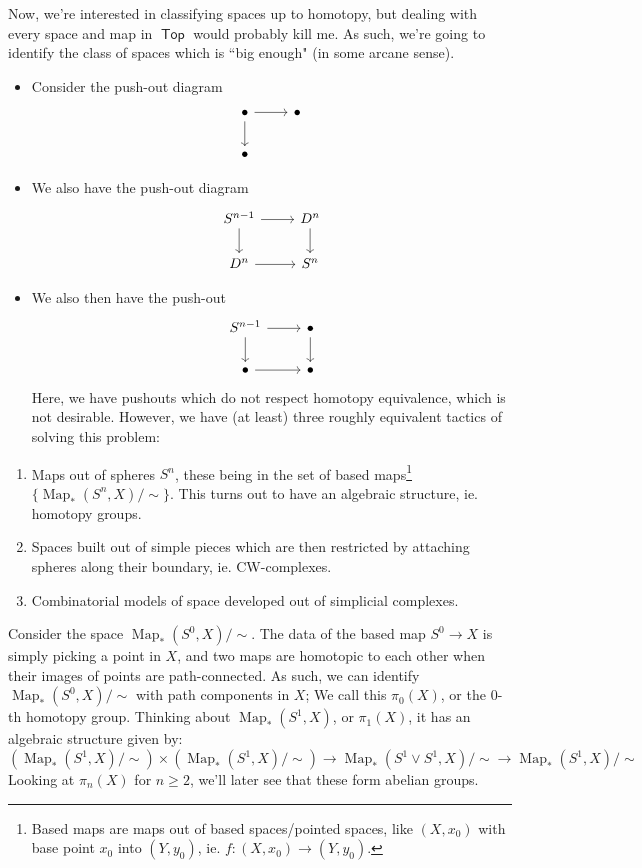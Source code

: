 \documentclass[leqno, openany]{memoir}
\theoremstyle{definition}
\theoremstyle{remark}
\theoremstyle{plain}
\theoremstyle{definition}
\theoremstyle{remark}
\DeclareMathOperator{\Top}{\mathsf{Top}}
\DeclareMathOperator{\Map}{Map}
\begin{document}
Now, we're interested in classifying spaces up to homotopy, but dealing with every space and map in $\Top$ would probably kill me. As such, we're going to identify the class of spaces which is ``big enough" (in some arcane sense).

\begin{itemize}
    \item Consider the push-out diagram 
\[\begin{tikzcd}
    \bullet \ar[d] \ar[r] & \bullet \\ \bullet
\end{tikzcd}\]
\item We also have the push-out diagram 
\[\begin{tikzcd}
    S^{n-1} \ar[r] \ar[d] & D^n \ar[d]\\ D^n \ar[r] & S^n
\end{tikzcd}\]
\item We also then have the push-out
\[\begin{tikzcd}
    S^{n-1} \ar[r] \ar[d] &\bullet \ar[d] \\ \bullet \ar[r] & \bullet
\end{tikzcd}\]
Here, we have pushouts which do not respect homotopy equivalence, which is not desirable. However, we have (at least) three roughly equivalent tactics of solving this problem:
\end{itemize}
\newpage 

\begin{enumerate}
    \item Maps out of spheres $S^n$, these being in the set of based maps\footnote{Based maps are maps out of based spaces/pointed spaces, like $(X,x_0)$ with base point $x_0$ into $(Y, y_0)$, ie. $f: (X,x_0) \to (Y,y_0)$.} $\{\Map_\ast (S^n, X)/\sim \}$. This turns out to have an algebraic structure, ie. homotopy groups.
    \item Spaces built out of simple pieces which are then restricted by attaching spheres along their boundary, ie. CW-complexes.
    \item Combinatorial models of space developed out of simplicial complexes.
\end{enumerate}

Consider the space $\Map_\ast(S^0, X)/\sim $. The data of the based map $S^0 \to X$ is simply picking a point in $X$, and two maps are homotopic to each other when their images of points are path-connected. As such, we can identify $\Map_\ast(S^0, X)/\sim$ with path components in $X$; We call this $\pi_0(X)$, or the $0$-th homotopy group. Thinking about $\Map_\ast(S^1, X)$, or $\pi_1(X)$, it has an algebraic structure given by:
\[\left(\Map_\ast(S^1,X)/\sim\right) \times \left( \Map_\ast(S^1, X)/\sim \right) \rightarrow \Map_\ast(S^1 \vee S^1, X)/\sim \rightarrow \Map_\ast(S^1, X)/\sim\]
Looking at $\pi_n(X)$ for $n \geq 2$, we'll later see that these form abelian groups. 
\end{document}
